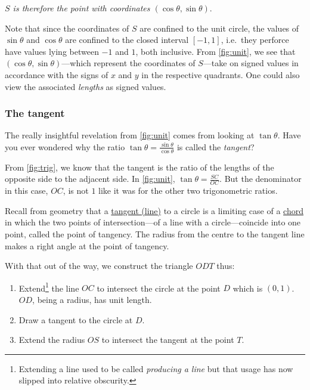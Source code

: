 \documentclass[
  a4paper,
]{article}
\providecommand{\tightlist}{%
  \setlength{\itemsep}{0pt}\setlength{\parskip}{0pt}}
\begin{document}
\emph{\(S\) is therefore the point with coordinates
\((\cos\theta, \sin\theta)\)}.

Note that since the coordinates of \(S\) are confined to the unit
circle, the values of \(\sin\theta\) and \(\cos\theta\) are confined to
the closed interval \([-1, 1]\), i.e.~they perforce have values lying
between \(-1\) and \(1\), both inclusive. From \cref{fig:unit}, we see
that \((\cos\theta, \sin\theta)\)---which represent the coordinates of
\(S\)---take on signed values in accordance with the signs of \(x\) and
\(y\) in the respective quadrants. One could also view the associated
\emph{lengths} as signed values.

\hypertarget{the-tangent}{%
\subsubsection{The tangent}\label{the-tangent}}

The really insightful revelation from \cref{fig:unit} comes from looking
at \(\tan\theta\). Have you ever wondered why the ratio
\(\tan\theta = \frac{\sin\theta}{\cos\theta}\) is called the
\emph{tangent}?

From \cref{fig:trig}, we know that the tangent is the ratio of the
lengths of the opposite side to the adjacent side. In \cref{fig:unit},
\(\tan\theta = \frac{SC}{OC}\). But the denominator in this case,
\(OC\), is not \(1\) like it was for the other two trigonometric ratios.

Recall from geometry that a
\href{https://en.wikipedia.org/wiki/Tangent_lines_to_circles}{tangent
(line)} to a circle is a limiting case of a
\href{https://en.wikipedia.org/wiki/Chord_(geometry)}{chord} in which
the two points of intersection---of a line with a circle---coincide into
one point, called the point of tangency. The radius from the centre to
the tangent line makes a right angle at the point of tangency.

With that out of the way, we construct the triangle \(ODT\) thus:

\begin{enumerate}
\def\labelenumi{\alph{enumi}.}
\tightlist
\item
  Extend\footnote{Extending a line used to be called \emph{producing a
    line} but that usage has now slipped into relative obscurity.} the
  line \(OC\) to intersect the circle at the point \(D\) which is
  \((0, 1)\). \(OD\), being a radius, has unit length.
\item
  Draw a tangent to the circle at \(D\).
\item
  Extend the radius \(OS\) to intersect the tangent at the point \(T\).
\end{enumerate}
\end{document}
